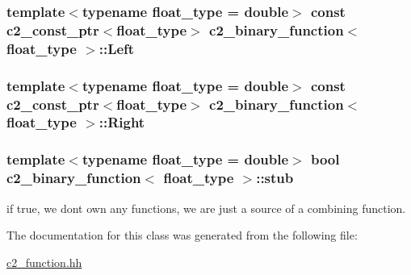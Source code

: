 \subsubsection[{\texorpdfstring{Left}{Left}}]{\setlength{\rightskip}{0pt plus 5cm}template$<$typename float\+\_\+type = double$>$ const {\bf c2\+\_\+const\+\_\+ptr}$<$float\+\_\+type$>$ {\bf c2\+\_\+binary\+\_\+function}$<$ float\+\_\+type $>$\+::Left\hspace{0.3cm}{\ttfamily [protected]}}\hypertarget{classc2__binary__function_a53d43543e7057fe762fd14ae58ac327a}{}\label{classc2__binary__function_a53d43543e7057fe762fd14ae58ac327a}
\subsubsection[{\texorpdfstring{Right}{Right}}]{\setlength{\rightskip}{0pt plus 5cm}template$<$typename float\+\_\+type = double$>$ const {\bf c2\+\_\+const\+\_\+ptr}$<$float\+\_\+type$>$ {\bf c2\+\_\+binary\+\_\+function}$<$ float\+\_\+type $>$\+::Right\hspace{0.3cm}{\ttfamily [protected]}}\hypertarget{classc2__binary__function_a52b7fcaed6a4c3e3146dea43f562db8d}{}\label{classc2__binary__function_a52b7fcaed6a4c3e3146dea43f562db8d}
\subsubsection[{\texorpdfstring{stub}{stub}}]{\setlength{\rightskip}{0pt plus 5cm}template$<$typename float\+\_\+type = double$>$ bool {\bf c2\+\_\+binary\+\_\+function}$<$ float\+\_\+type $>$\+::stub\hspace{0.3cm}{\ttfamily [protected]}}\hypertarget{classc2__binary__function_a7d6abdb0e7fcfb4fd65833a42f93c561}{}\label{classc2__binary__function_a7d6abdb0e7fcfb4fd65833a42f93c561}


if true, we don\textquotesingle{}t own any functions, we are just a source of a combining function. 



The documentation for this class was generated from the following file\+:\begin{DoxyCompactItemize}
\item 
\hyperlink{c2__function_8hh}{c2\+\_\+function.\+hh}\end{DoxyCompactItemize}
